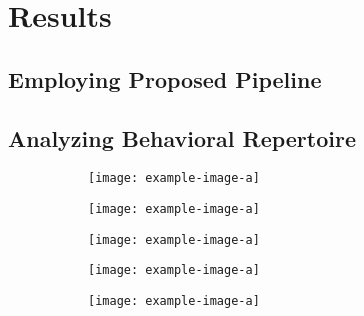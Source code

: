 \chapter{Results}

\section{Employing Proposed Pipeline}\label{section:employing-proposed-pipeline}

\section{Analyzing Behavioral Repertoire}\label{section:analyzing-behavioral-repertoire}
\begin{figure}[ht!]
	\centering
	\begin{subfigure}[ht!]{0.24\linewidth}
		\centering\texttt{[image: example-image-a]}
		\caption{\label{figure:correlations-btw-features}}
	\end{subfigure}%
\end{figure}

\begin{figure}[ht!]
	\centering
	\begin{subfigure}[ht!]{0.24\linewidth}
		\centering\texttt{[image: example-image-a]}
		\caption{\label{figure:supervised-disparate-zoomin-annotations}}
	\end{subfigure}%
	\hfill
	\centering
	\begin{subfigure}[ht!]{0.24\linewidth}
		\centering\texttt{[image: example-image-a]}
		\caption{\label{figure:unsupervised-disparate-behavioral-regions}}
	\end{subfigure}%
\end{figure}

\begin{figure}[ht!]
	\centering
	\begin{subfigure}[ht!]{0.24\linewidth}
		\centering\texttt{[image: example-image-a]}
		\caption{}
	\end{subfigure}%
	\hfill
	\centering
	\begin{subfigure}[ht!]{0.24\linewidth}
		\centering\texttt{[image: example-image-a]}
		\caption{}
	\end{subfigure}%
	\caption{\label{figure:joint-behavioral-embeddings}}
\end{figure}
